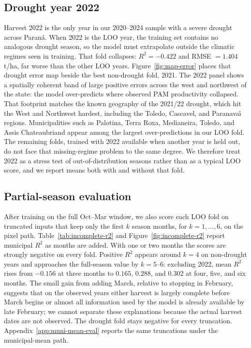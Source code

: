 \subsection{Drought year 2022}
Harvest 2022 is the only year in our 2020--2024 sample with a severe drought across Paran\'{a}.
When 2022 is the LOO year, the training set contains no analogous drought season, so the model must extrapolate outside the climatic regimes seen in training.
That fold collapses: $R^2=-0.422$ and RMSE $=1.404$\,\si{t/ha}, far worse than the other LOO years.
Figure~\ref{fig:map-error} places that drought error map beside the best non-drought fold, 2021.
The 2022 panel shows a spatially coherent band of large positive errors across the west and northwest of the state: the model over-predicts where observed PAM productivity collapsed.
That footprint matches the known geography of the 2021/22 drought, which hit the West and Northwest hardest, including the Toledo, Cascavel, and Paranava\'{\i} regions.
Municipalities such as Palotina, Terra Roxa, Medianeira, Toledo, and Assis Chateaubriand appear among the largest over-predictions in our LOO fold.
The remaining folds, trained with 2022 available when another year is held out, do not face that missing-regime problem to the same degree.
We therefore treat 2022 as a stress test of out-of-distribution seasons rather than as a typical LOO score, and we report means both with and without that fold.

\subsection{Partial-season evaluation}
\label{sec:incomplete-series}
After training on the full Oct--Mar window, we also score each LOO fold on truncated inputs that keep only the first $k$ season months, for $k=1,\ldots,6$, on the pixel path.
Table~\ref{tab:incomplete-r2} and Figure~\ref{fig:incomplete-r2} report municipal $R^2$ as months are added.
With one or two months the scores are strongly negative on every fold.
Positive $R^2$ appears around $k=4$ on non-drought years and approaches the full-season value by $k=5$--$6$: excluding 2022, mean $R^2$ rises from $-0.156$ at three months to $0.165$, $0.288$, and $0.302$ at four, five, and six months.
The small gain from adding March, relative to stopping in February, suggests that on the observed years either harvest is largely complete before March begins or almost all information used by the model is already available by late February; we cannot separate these explanations because the actual harvest dates are not observed.
The drought fold stays negative for every truncation.
Appendix~\ref{app:muni-mean-eval} reports the same truncations under the municipal-mean path.

